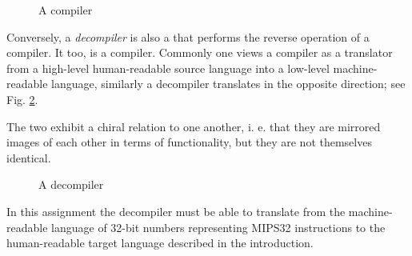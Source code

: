 \begin{figure}[H]
  \centering
  
  \caption{A compiler}
  \label{fig:compiler}
\end{figure}

Conversely, a \emph{decompiler} is also a that performs the reverse
operation of a compiler. It too, is a compiler. Commonly one views a
compiler as a translator from a high-level human-readable source
language into a low-level machine-readable language, similarly a
decompiler translates in the opposite direction; see
Fig. \ref{fig:decompiler}. 

The two exhibit a chiral relation to one another, i. e. that they are
mirrored images of each other in terms of functionality, but they are
not themselves identical.

\begin{figure}[H]
  \centering
  
  \caption{A decompiler}
  \label{fig:decompiler}
\end{figure}

In this assignment the decompiler must be able to translate from the
machine-readable language of 32-bit numbers representing MIPS32
instructions to the human-readable target language described in the
introduction.

